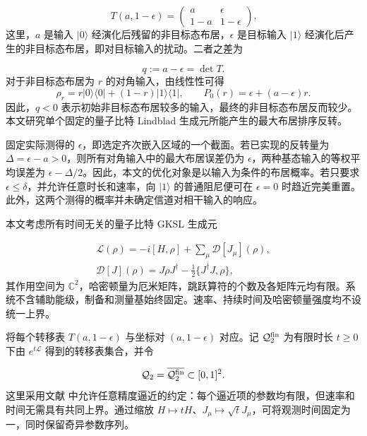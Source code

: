 \documentclass[aps,pra,reprint,amsmath,amssymb,nofootinbib,floatfix,longbibliography]{revtex4-2}
\theoremstyle{aps}
\newcommand{\Q}{\mathcal Q_2}
\newcommand{\Diss}{\mathcal D}
\newcommand{\eps}{\epsilon}
\newcommand{\ket}[1]{|#1\rangle}
\newcommand{\proj}[1]{|#1\rangle\langle#1|}
\begin{document}
\begin{equation}\label{eq:table}
 T(a,1-\eps)=\begin{pmatrix}a&\eps\\1-a&1-\eps\end{pmatrix}.
\end{equation}
这里，$a$ 是输入 $\ket0$ 经演化后残留的非目标态布居，$\eps$ 是目标输入 $\ket1$ 经演化后产生的非目标态布居，即对目标输入的扰动。二者之差为

\begin{equation}\label{eq:det}
 q:=a-\eps=\det T.
\end{equation}
对于非目标态布居为 $r$ 的对角输入，由线性性可得
\begin{equation}\label{eq:population-order}
 \rho_r=r\proj0+(1-r)\proj1,\qquad
 P_0(r)=\eps+(a-\eps)r.
\end{equation}
因此，$q<0$ 表示初始非目标态布居较多的输入，最终的非目标态布居反而较少。本文研究单个固定的量子比特 Lindblad 生成元所能产生的最大布居排序反转。

固定实际测得的 $\eps$，即选定齐次嵌入区域的一个截面。若已实现的反转量为 $\Delta=\eps-a>0$，则所有对角输入中的最大布居误差仍为 $\eps$，两种基态输入的等权平均误差为 $\eps-\Delta/2$。因此，本文的优化对象是以输入为条件的布居概率。若只要求 $\eps\le\delta$，并允许任意时长和速率，向 $\ket1$ 的普通阻尼便可在 $\eps=0$ 时趋近完美重置。此外，这两个测得的概率并未确定信道对相干输入的响应。


本文考虑所有时间无关的量子比特 GKSL 生成元 \cite{GKS1976,Lindblad1976}

\begin{equation}\label{eq:gksl}
 \begin{gathered}
 \mathcal L(\rho)=-i[H,\rho]+\sum_\mu\Diss[J_\mu](\rho),\\
 \Diss[J](\rho)=J\rho J^\dagger-\tfrac12\{J^\dagger J,\rho\},
 \end{gathered}
\end{equation}
其作用空间为 $\mathbb C^2$，哈密顿量为厄米矩阵，跳跃算符的个数及各矩阵元均有限。系统不含辅助能级，制备和测量基始终固定。速率、持续时间及哈密顿量强度均不设统一上界。

将每个转移表 $T(a,1-\eps)$ 与坐标对 $(a,1-\eps)$ 对应。记 $\mathcal Q_2^{\rm fin}$ 为有限时长 $t\ge0$ 下由 $e^{t\mathcal L}$ 得到的转移表集合，并令

\begin{equation}\label{eq:closure}
 \Q=\overline{\mathcal Q_2^{\rm fin}}\subset[0,1]^2.
\end{equation}
这里采用文献 \cite{Shahbeigi2024} 中允许任意精度逼近的约定：每个逼近项的参数均有限，但速率和时间无需具有共同上界。通过缩放 $H\mapsto tH$、$J_\mu\mapsto\sqrt tJ_\mu$，可将观测时间固定为一，同时保留奇异参数序列。
\end{document}
